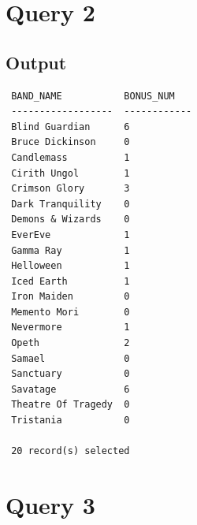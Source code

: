 \documentclass{report}
\begin{document}
\section*{Query 2}
\subsection*{Output}
\begin{verbatim}
 BAND_NAME           BONUS_NUM    
 ------------------  ------------ 
 Blind Guardian      6            
 Bruce Dickinson     0            
 Candlemass          1            
 Cirith Ungol        1            
 Crimson Glory       3            
 Dark Tranquility    0            
 Demons & Wizards    0            
 EverEve             1            
 Gamma Ray           1            
 Helloween           1            
 Iced Earth          1            
 Iron Maiden         0            
 Memento Mori        0            
 Nevermore           1            
 Opeth               2            
 Samael              0            
 Sanctuary           0            
 Savatage            6            
 Theatre Of Tragedy  0            
 Tristania           0            

 20 record(s) selected
\end{verbatim}


\section*{Query 3}
\end{document}
